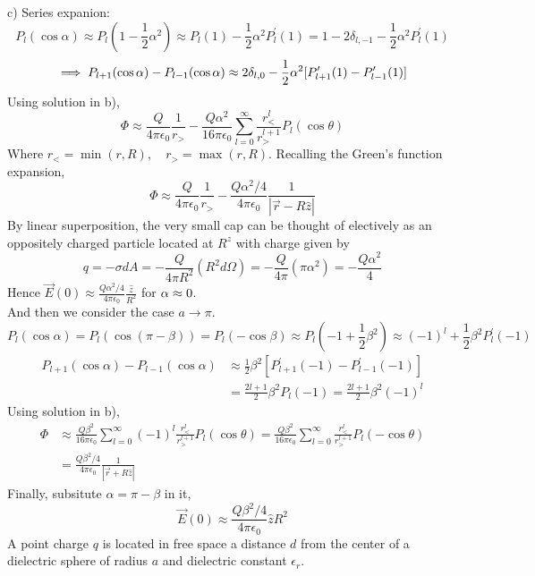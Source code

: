 \documentclass[UTF8,9pt]{ctexart}
\begin{document}
c) 
Series expanion:
$$ 
P_{l}(\cos \alpha) \approx P_{l}(1-\frac{1}{2} \alpha^{2}) \approx P_{l}(1)-\frac{1}{2} \alpha^{2} P_{l}^{\prime}(1)=1-2 \delta_{l,-1}-\frac{1}{2} \alpha^{2} P_{l}^{\prime}(1)
$$
$$ 
\implies P_{l+1}(\cos \alpha)-P_{l-1}(\cos \alpha) \approx 2 \delta_{l, 0}-\frac{1}{2} \alpha^{2}[P_{l+1}^{\prime}(1)-P_{l-1}^{\prime}(1)]
 $$
Using solution in b), 
$$ 
\Phi \approx \frac{Q}{4 \pi \epsilon_{0}} \frac{1}{r_{>}}-\frac{Q \alpha^{2}}{16 \pi \epsilon_{0}} \sum_{l=0}^{\infty} \frac{r_{<}^{l}}{r_{>}^{l+1}} P_{l}(\cos \theta)
 $$
Where $r_{<}=\min (r, R), \quad r_{>}=\max (r, R)$. Recalling the Green's function expansion,
$$ 
\Phi \approx \frac{Q}{4 \pi \epsilon_{0}} \frac{1}{r_{>}}-\frac{Q \alpha^{2} / 4}{4 \pi \epsilon_{0}} \frac{1}{|\vec{r}-R \hat{z}|}
 $$
 By linear superposition, the very small cap can be thought of electively as an oppositely charged particle located at $R^z$ with charge given by
 $$ 
 q=-\sigma d A=-\frac{Q}{4 \pi R^{2}}(R^{2} d \Omega)=-\frac{Q}{4 \pi}(\pi \alpha^{2})=-\frac{Q \alpha^{2}}{4}
  $$
Hence $\vec{E}(0) \approx \frac{Q \alpha^{2} / 4}{4 \pi \epsilon_{0}} \frac{\hat{z}}{R^{2}}$ for $\alpha \approx 0$. \\

And then we consider the case $a \rightarrow \pi$. 
$$ 
P_{l}(\cos \alpha)=P_{l}(\cos (\pi-\beta))=P_{l}(-\cos \beta) \approx P_{l}(-1+\frac{1}{2} \beta^{2}) \approx(-1)^{l}+\frac{1}{2} \beta^{2} P_{l}^{\prime}(-1)
 $$
 $$ 
\begin{aligned} P_{l+1}(\cos \alpha)-P_{l-1}(\cos \alpha) & \approx \frac{1}{2} \beta^{2}[P_{l+1}^{\prime}(-1)-P_{l-1}^{\prime}(-1)] \\ &=\frac{2 l+1}{2} \beta^{2} P_{l}(-1)=\frac{2 l+1}{2} \beta^{2}(-1)^{l} \end{aligned}
 $$
 Using solution in b), 
 $$ 
\begin{aligned} \Phi & \approx \frac{Q \beta^{2}}{16 \pi \epsilon_{0}} \sum_{l=0}^{\infty}(-1)^{l} \frac{r_{<}^{l}}{r_{>}^{l+1}} P_{l}(\cos \theta)=\frac{Q \beta^{2}}{16 \pi \epsilon_{0}} \sum_{l=0}^{\infty} \frac{r_{<}^{l}}{r_{>}^{l+1}} P_{l}(-\cos \theta) \\ &=\frac{Q \beta^{2} / 4}{4 \pi \epsilon_{0}} \frac{1}{|\vec{r}+R \hat{z}|} \end{aligned}
 $$
Finally, subsitute $\alpha=\pi-\beta$ in it, 
$$ 
\vec{E}(0) \approx \frac{Q \beta^{2} / 4}{4 \pi \epsilon_{0}} \hat{z} R^{2}
 $$
A point charge $q$ is located in free space a distance $d$ from the center of a dielectric sphere of radius $a$ and dielectric constant $\epsilon_r$.
\end{document}
